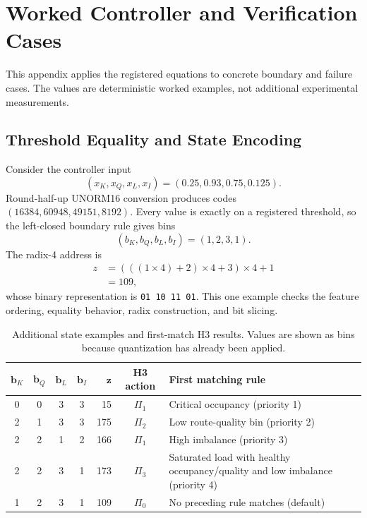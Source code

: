 \chapter{Worked Controller and Verification Cases}
\label{app:worked-cases}

This appendix applies the registered equations to concrete boundary and failure
cases. The values are deterministic worked examples, not additional experimental
measurements.

\section{Threshold Equality and State Encoding}

Consider the controller input
\begin{equation}
(x_K,x_Q,x_L,x_I)=(0.25,0.93,0.75,0.125).
\end{equation}
Round-half-up UNORM16 conversion produces codes
$(16384,60948,49151,8192)$. Every value is exactly on a registered threshold, so
the left-closed boundary rule gives bins
\begin{equation}
(b_K,b_Q,b_L,b_I)=(1,2,3,1).
\end{equation}
The radix-4 address is
\begin{align}
z&=(((1\times4)+2)\times4+3)\times4+1\\
 &=109,
\end{align}
whose binary representation is \texttt{01 10 11 01}. This one example checks the
feature ordering, equality behavior, radix construction, and bit slicing.

\begin{table}[H]
\centering
\caption{Additional state examples and first-match H3 results. Values are shown as
bins because quantization has already been applied.}
\label{tab:worked-h3-states}
\begin{tabularx}{\textwidth}{@{}ccccr c X@{}}
\toprule
$\boldsymbol b_K$ & $\boldsymbol b_Q$ & $\boldsymbol b_L$ &
$\boldsymbol b_I$ & $\boldsymbol z$ & \textbf{H3 action} & \textbf{First matching rule}\\
\midrule
0 & 0 & 3 & 3 & 15 & $\Pi_1$ & Critical occupancy (priority 1)\\
2 & 1 & 3 & 3 & 175 & $\Pi_2$ & Low route-quality bin (priority 2)\\
2 & 2 & 1 & 2 & 166 & $\Pi_1$ & High imbalance (priority 3)\\
2 & 2 & 3 & 1 & 173 & $\Pi_3$ & Saturated load with healthy occupancy/quality
and low imbalance (priority 4)\\
1 & 2 & 3 & 1 & 109 & $\Pi_0$ & No preceding rule matches (default)\\
\bottomrule
\end{tabularx}
\end{table}

